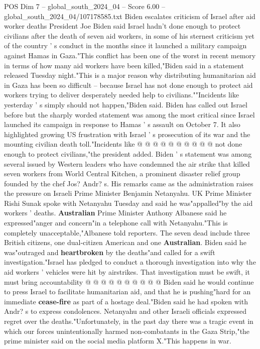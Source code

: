 \begin{textsample}{POS Dim 7 – global\_south\_2024\_04 – Score 6.00 – global\_south\_2024\_04/107178585.txt}  \label{ex:f7_pos_172}
Biden escalates criticism of Israel after aid worker deaths President Joe Biden said Israel hadn't done enough to protect civilians after the death of seven aid workers, in some of his sternest criticism yet of the country ' s conduct in the months since it launched a military campaign against Hamas in Gaza."This conflict has been one of the worst in recent memory in terms of how many aid workers have been killed,"Biden said in a statement released Tuesday night."This is a major reason why distributing humanitarian aid in Gaza has been so difficult -- because Israel has not done enough to protect aid workers trying to deliver desperately needed help to civilians.""Incidents like yesterday ' s simply should not happen,"Biden said.
Biden has called out Israel before but the sharply worded statement was among the most critical since Israel launched its campaign in response to Hamas ' s assault on October 7.
It also highlighted growing US frustration with Israel ' s prosecution of its war and the mounting civilian death toll."Incidents like @ @ @ @ @ @ @ @ @ @ not done enough to protect civilians,"the president added.
Biden ' s statement was among several issued by Western leaders who have condemned the air strike that killed seven workers from World Central Kitchen, a prominent disaster relief group founded by the chef Jos?
Andr? s.
His remarks came as the administration raises the pressure on Israeli Prime Minister Benjamin Netanyahu.
UK Prime Minister Rishi Sunak spoke with Netanyahu Tuesday and said he was"appalled"by the aid workers ' deaths. \textbf{Australian} Prime Minister Anthony Albanese said he expressed"anger and concern"in a telephone call with Netanyahu."This is completely unacceptable,"Albanese told reporters.
The seven dead include three British citizens, one dual-citizen American and one \textbf{Australian}.
Biden said he was"outraged and \textbf{heartbroken} by the deaths"and called for a swift investigation."Israel has pledged to conduct a thorough investigation into why the aid workers ' vehicles were hit by airstrikes.
That investigation must be swift, it must bring accountability @ @ @ @ @ @ @ @ @ @ Biden said he would continue to press Israel to facilitate humanitarian aid, and that he is pushing"hard for an immediate \textbf{cease-fire} as part of a hostage deal."Biden said he had spoken with Andr? s to express condolences.
Netanyahu and other Israeli officials expressed regret over the deaths."Unfortunately, in the past day there was a tragic event in which our forces unintentionally harmed non-combatants in the Gaza Strip,"the prime minister said on the social media platform X."This happens in war.

\end{textsample}
